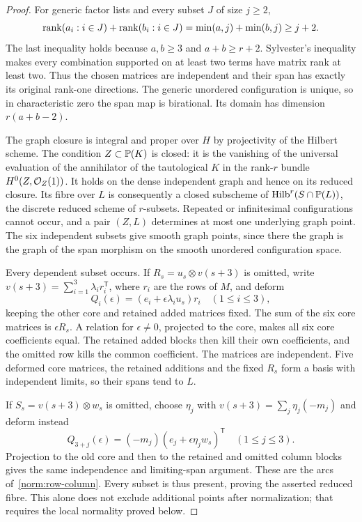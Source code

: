 \begin{proof}
For generic factor lists and every subset $J$ of size $j\geq2$,
\[
 \operatorname{rank}(a_i:i\in J)+\operatorname{rank}(b_i:i\in J)
 =\min(a,j)+\min(b,j)\geq j+2.
\]
The last inequality holds because $a,b\geq3$ and $a+b\geq r+2$.
Sylvester's inequality makes every combination supported on at least
two terms have matrix rank at least two. Thus the chosen matrices
are independent and their span has exactly its original rank-one
directions. The generic unordered configuration is unique, so in
characteristic zero the span map is birational. Its domain has
dimension $r(a+b-2)$.

The graph closure is integral and proper over $H$ by projectivity of
the Hilbert scheme. The condition $Z\subset\mathbb P(K)$ is closed: it is
the vanishing of the universal evaluation of the annihilator of the
tautological $K$ in the rank-$r$ bundle $H^0(Z,\mathcal O_Z(1))$. It holds
on the dense independent graph and hence on its reduced closure.
Its fibre over $L$ is consequently a closed subscheme of
$\operatorname{Hilb}^r(S\cap\mathbb P(L))$, the discrete reduced scheme
of $r$-subsets. Repeated or infinitesimal configurations cannot occur,
and a pair $(Z,L)$ determines at most one underlying graph point.
The six independent subsets give smooth graph points, since there
the graph is the graph of the span morphism on the smooth
unordered configuration space.

Every dependent subset occurs. If $R_s=u_s\otimes v(s+3)$ is
omitted, write $v(s+3)=\sum_{i=1}^3\lambda_i r_i^{\mathsf T}$,
where $r_i$ are the rows of $M$, and deform
\begin{equation}\label{nb:row-arc}
 Q_i(\epsilon)=(e_i+\epsilon\lambda_i u_s)r_i
 \quad(1\leq i\leq3),
\end{equation}
keeping the other core and retained added matrices fixed. The sum
of the six core matrices is $\epsilon R_s$. A relation for
$\epsilon\ne0$, projected to the core, makes all six core
coefficients equal. The retained added blocks then kill their own
coefficients, and the omitted row kills the common coefficient.
The matrices are independent. Five deformed core matrices, the
retained additions and the fixed $R_s$ form a basis with independent
limits, so their spans tend to $L$.

If $S_s=v(s+3)\otimes w_s$ is omitted, choose $\eta_j$ with
$v(s+3)=\sum_j\eta_j(-m_j)$ and deform instead
\begin{equation}\label{nb:column-arc}
 Q_{3+j}(\epsilon)=(-m_j)(e_j+\epsilon\eta_jw_s)^{\mathsf T}
 \quad(1\leq j\leq3).
\end{equation}
Projection to the old core and then to the retained and omitted
column blocks gives the same independence and limiting-span argument.
These are the arcs of~\ref{norm:row-column}. Every subset is thus
present, proving the asserted reduced fibre. This alone does not
exclude additional points after normalization; that requires the
local normality proved below.
\end{proof}

